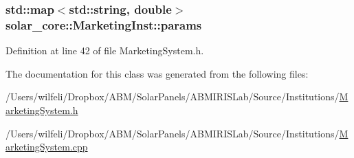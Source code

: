 \hypertarget{classsolar__core_1_1_marketing_inst_a58a4f5acc2492edebfde65bee94802b9}{}
\subsubsection[{params}]{\setlength{\rightskip}{0pt plus 5cm}std\+::map$<$std\+::string, double$>$ solar\+\_\+core\+::\+Marketing\+Inst\+::params\hspace{0.3cm}{\ttfamily [protected]}}\label{classsolar__core_1_1_marketing_inst_a58a4f5acc2492edebfde65bee94802b9}


Definition at line 42 of file Marketing\+System.\+h.



The documentation for this class was generated from the following files\+:\begin{DoxyCompactItemize}
\item 
/\+Users/wilfeli/\+Dropbox/\+A\+B\+M/\+Solar\+Panels/\+A\+B\+M\+I\+R\+I\+S\+Lab/\+Source/\+Institutions/\hyperlink{_marketing_system_8h}{Marketing\+System.\+h}\item 
/\+Users/wilfeli/\+Dropbox/\+A\+B\+M/\+Solar\+Panels/\+A\+B\+M\+I\+R\+I\+S\+Lab/\+Source/\+Institutions/\hyperlink{_marketing_system_8cpp}{Marketing\+System.\+cpp}\end{DoxyCompactItemize}
